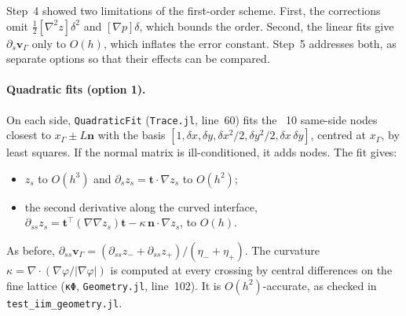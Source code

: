 \documentclass[11pt,a4paper]{article}
\newcommand{\code}[1]{\texttt{#1}}
\begin{document}
Step~4 showed two limitations of the first-order scheme. First, the corrections omit
$\tfrac12[\nabla^2z]\delta^2$ and $[\nabla p]\delta$, which bounds the order. Second, the linear
fits give $\partial_s\mathbf v_\Gamma$ only to $O(h)$, which inflates the error constant. Step~5
addresses both, as separate options so that their effects can be compared.

\paragraph{Quadratic fits (option 1).} On each side, \code{QuadraticFit}
(\code{Trace.jl}, line~60) fits the ~10 same-side nodes closest to $x_\Gamma\pm L\mathbf n$ with
the basis $[1,\delta x,\delta y,\delta x^2/2,\delta y^2/2,\delta x\,\delta y]$, centred at
$x_\Gamma$, by least squares. If the normal matrix is ill-conditioned, it adds nodes. The fit
gives:
\begin{itemize}
  \item $z_s$ to $O(h^3)$ and $\partial_sz_s=\mathbf t\cdot\nabla z_s$ to $O(h^2)$;
  \item the second derivative along the curved interface,
    $\partial_{ss}z_s=\mathbf t^\top(\nabla\nabla z_s)\mathbf t-\kappa\,\mathbf n\cdot\nabla z_s$,
    to $O(h)$.
\end{itemize}
As before, $\partial_{ss}\mathbf v_\Gamma=(\partial_{ss}z_-+\partial_{ss}z_+)/(\eta_-+\eta_+)$.
The curvature $\kappa=\nabla\cdot(\nabla\varphi/|\nabla\varphi|)$ is computed at every crossing
by central differences on the fine lattice (\code{κΦ}, \code{Geometry.jl}, line~102). It is
$O(h^2)$-accurate, as checked in \code{test\_iim\_geometry.jl}.
\end{document}
